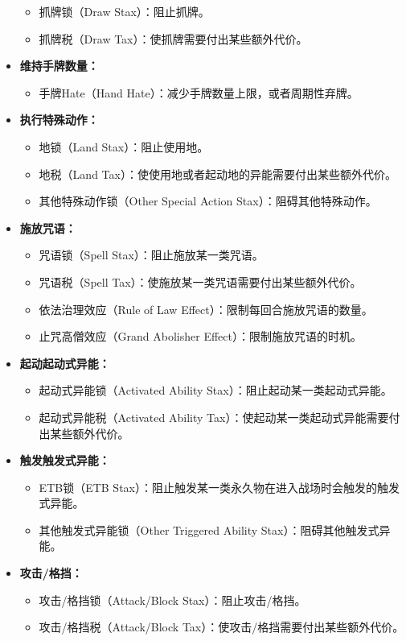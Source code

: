 \documentclass[lang = cn, color = black, 10pt]{AllThatStax}
\begin{document}
\begin{itemize}
\begin{itemize}
			\item 抓牌锁（Draw Stax）：阻止抓牌。
			\item 抓牌税（Draw Tax）：使抓牌需要付出某些额外代价。
		\end{itemize}
	\item \textbf{维持手牌数量：}
		\begin{itemize}
			\item 手牌Hate（Hand Hate）：减少手牌数量上限，或者周期性弃牌。
		\end{itemize}
	\item \textbf{执行特殊动作：}
		\begin{itemize}
			\item 地锁（Land Stax）：阻止使用地。
			\item 地税（Land Tax）：使使用地或者起动地的异能需要付出某些额外代价。
			\item 其他特殊动作锁（Other Special Action Stax）：阻碍其他特殊动作。
		\end{itemize}
	\item \textbf{施放咒语：}
		\begin{itemize}
			\item 咒语锁（Spell Stax）：阻止施放某一类咒语。
			\item 咒语税（Spell Tax）：使施放某一类咒语需要付出某些额外代价。
			\item 依法治理效应（Rule of Law Effect）：限制每回合施放咒语的数量。
			\item 止咒高僧效应（Grand Abolisher Effect）：限制施放咒语的时机。
		\end{itemize}
	\item \textbf{起动起动式异能：}
		\begin{itemize}
			\item 起动式异能锁（Activated Ability Stax）：阻止起动某一类起动式异能。
			\item 起动式异能税（Activated Ability Tax）：使起动某一类起动式异能需要付出某些额外代价。
		\end{itemize}
	\item \textbf{触发触发式异能：}
		\begin{itemize}
			\item ETB锁（ETB Stax）：阻止触发某一类永久物在进入战场时会触发的触发式异能。
			\item 其他触发式异能锁（Other Triggered Ability Stax）：阻碍其他触发式异能。
		\end{itemize}
	\item \textbf{攻击/格挡：}
		\begin{itemize}
			\item 攻击/格挡锁（Attack/Block Stax）：阻止攻击/格挡。
			\item 攻击/格挡税（Attack/Block Tax）：使攻击/格挡需要付出某些额外代价。
		\end{itemize}
\end{itemize}
\end{document}
